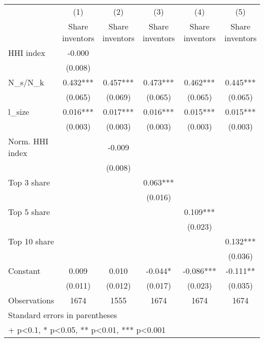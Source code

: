 {
\def\sym#1{\ifmmode^{#1}\else\(^{#1}\)\fi}
\begin{tabular}{l*{5}{c}}
\hline\hline
                    &\multicolumn{1}{c}{(1)}&\multicolumn{1}{c}{(2)}&\multicolumn{1}{c}{(3)}&\multicolumn{1}{c}{(4)}&\multicolumn{1}{c}{(5)}\\
                    &\multicolumn{1}{c}{Share inventors}&\multicolumn{1}{c}{Share inventors}&\multicolumn{1}{c}{Share inventors}&\multicolumn{1}{c}{Share inventors}&\multicolumn{1}{c}{Share inventors}\\
\hline
HHI index           &      -0.000   &               &               &               &               \\
                    &     (0.008)   &               &               &               &               \\
[1em]
N\_s/N\_k             &       0.432***&       0.457***&       0.473***&       0.462***&       0.445***\\
                    &     (0.065)   &     (0.069)   &     (0.065)   &     (0.065)   &     (0.065)   \\
[1em]
l\_size              &       0.016***&       0.017***&       0.016***&       0.015***&       0.015***\\
                    &     (0.003)   &     (0.003)   &     (0.003)   &     (0.003)   &     (0.003)   \\
[1em]
Norm. HHI index     &               &      -0.009   &               &               &               \\
                    &               &     (0.008)   &               &               &               \\
[1em]
Top 3 share         &               &               &       0.063***&               &               \\
                    &               &               &     (0.016)   &               &               \\
[1em]
Top 5 share         &               &               &               &       0.109***&               \\
                    &               &               &               &     (0.023)   &               \\
[1em]
Top 10 share        &               &               &               &               &       0.132***\\
                    &               &               &               &               &     (0.036)   \\
[1em]
Constant            &       0.009   &       0.010   &      -0.044*  &      -0.086***&      -0.111** \\
                    &     (0.011)   &     (0.012)   &     (0.017)   &     (0.023)   &     (0.035)   \\
\hline
Observations        &        1674   &        1555   &        1674   &        1674   &        1674   \\
\hline\hline
\multicolumn{6}{l}{\footnotesize Standard errors in parentheses}\\
\multicolumn{6}{l}{\footnotesize + p<0.1, * p<0.05, ** p<0.01, *** p<0.001}\\
\end{tabular}
}
